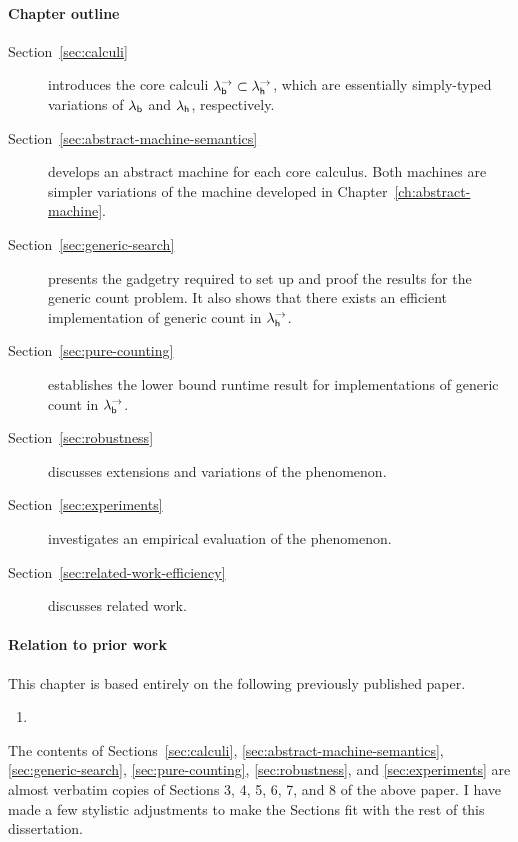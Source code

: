 \documentclass[12pt,phd,lfcs,twoside,openright,logo,leftchapter,normalheadings]{infthesis}
\makeatletter
\renewcommand\bibentry[1]{\nocite{#1}{\frenchspacing
     \@nameuse{BR@r@#1\@extra@b@citeb}}}
\theoremstyle{plain}
\theoremstyle{definition}
\makeatother
\begin{document}
\paragraph{Chapter outline}
\begin{description}
\item[Section~\ref{sec:calculi}] introduces the core calculi
  $\lambda^\rightarrow_{\mathsf{b}} \subset \lambda^\rightarrow_{\mathsf{h}}$, which are essentially simply-typed variations
  of $\lambda_{\mathsf{b}}$ and $\lambda_{\mathsf{h}}$, respectively.
\item[Section~\ref{sec:abstract-machine-semantics}] develops an
  abstract machine for each core calculus. Both machines are simpler
  variations of the machine developed in
  Chapter~\ref{ch:abstract-machine}.
\item[Section~\ref{sec:generic-search}] presents the gadgetry required
  to set up and proof the results for the generic count problem. It
  also shows that there exists an efficient implementation of generic
  count in $\lambda^\rightarrow_{\mathsf{h}}$.
\item[Section~\ref{sec:pure-counting}] establishes the lower bound
  runtime result for implementations of generic count in $\lambda^\rightarrow_{\mathsf{b}}$.
\item[Section~\ref{sec:robustness}] discusses extensions and variations of the phenomenon.
\item[Section~\ref{sec:experiments}] investigates an empirical evaluation of the phenomenon.
\item[Section~\ref{sec:related-work-efficiency}] discusses related work.
\end{description}

\paragraph{Relation to prior work} This chapter is based entirely on
the following previously published paper.
\begin{enumerate}
  \item[~] \bibentry{HillerstromLL20}
\end{enumerate}
The contents of Sections~\ref{sec:calculi},
\ref{sec:abstract-machine-semantics}, \ref{sec:generic-search},
\ref{sec:pure-counting}, \ref{sec:robustness}, and
\ref{sec:experiments} are almost verbatim copies of Sections 3, 4, 5,
6, 7, and 8 of the above paper. I have made a few stylistic
adjustments to make the Sections fit with the rest of this
dissertation.

\end{document}
